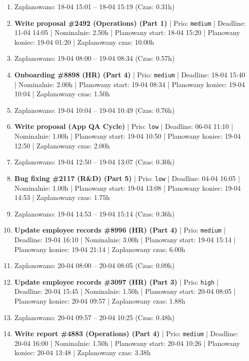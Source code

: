 {\begin{enumerate}
  \item [\textbf{PRZERWA}] Zaplanowano: 18-04 15:01 -- 18-04 15:19 (Czas: 0.31h)
  \item [\textbf{14668}] \textbf{Write proposal \#2492 (Operations) (Part 1)} | Prio: \texttt{medium} | Deadline: 11-04 14:05 | Nominalnie: 2.50h | Planowany start: 18-04 15:20 | Planowany koniec: 19-04 01:20 | Zaplanowany czas: 10.00h
  \item [\textbf{PRZERWA}] Zaplanowano: 19-04 08:00 -- 19-04 08:34 (Czas: 0.57h)
  \item [\textbf{14636}] \textbf{Onboarding \#8898 (HR) (Part 4)} | Prio: \texttt{medium} | Deadline: 18-04 15:40 | Nominalnie: 2.00h | Planowany start: 19-04 08:34 | Planowany koniec: 19-04 10:04 | Zaplanowany czas: 1.50h
  \item [\textbf{PRZERWA}] Zaplanowano: 19-04 10:04 -- 19-04 10:49 (Czas: 0.76h)
  \item [\textbf{14695}] \textbf{Write proposal (App QA Cycle)} | Prio: \texttt{low} | Deadline: 06-04 11:10 | Nominalnie: 1.00h | Planowany start: 19-04 10:50 | Planowany koniec: 19-04 12:50 | Zaplanowany czas: 2.00h
  \item [\textbf{PRZERWA}] Zaplanowano: 19-04 12:50 -- 19-04 13:07 (Czas: 0.30h)
  \item [\textbf{14689}] \textbf{Bug fixing \#2117 (R\&D) (Part 5)} | Prio: \texttt{low} | Deadline: 04-04 16:05 | Nominalnie: 1.00h | Planowany start: 19-04 13:08 | Planowany koniec: 19-04 14:53 | Zaplanowany czas: 1.75h
  \item [\textbf{PRZERWA}] Zaplanowano: 19-04 14:53 -- 19-04 15:14 (Czas: 0.36h)
  \item [\textbf{14655}] \textbf{Update employee records \#8996 (HR) (Part 4)} | Prio: \texttt{medium} | Deadline: 19-04 16:10 | Nominalnie: 3.00h | Planowany start: 19-04 15:14 | Planowany koniec: 19-04 21:14 | Zaplanowany czas: 6.00h
  \item [\textbf{PRZERWA}] Zaplanowano: 20-04 08:00 -- 20-04 08:05 (Czas: 0.09h)
  \item [\textbf{14621}] \textbf{Update employee records \#3097 (HR) (Part 3)} | Prio: \texttt{high} | Deadline: 20-04 15:45 | Nominalnie: 1.50h | Planowany start: 20-04 08:05 | Planowany koniec: 20-04 09:57 | Zaplanowany czas: 1.88h
  \item [\textbf{PRZERWA}] Zaplanowano: 20-04 09:57 -- 20-04 10:25 (Czas: 0.48h)
  \item [\textbf{14651}] \textbf{Write report \#4883 (Operations) (Part 4)} | Prio: \texttt{medium} | Deadline: 20-04 16:00 | Nominalnie: 1.50h | Planowany start: 20-04 10:26 | Planowany koniec: 20-04 13:48 | Zaplanowany czas: 3.38h

\end{enumerate}}
